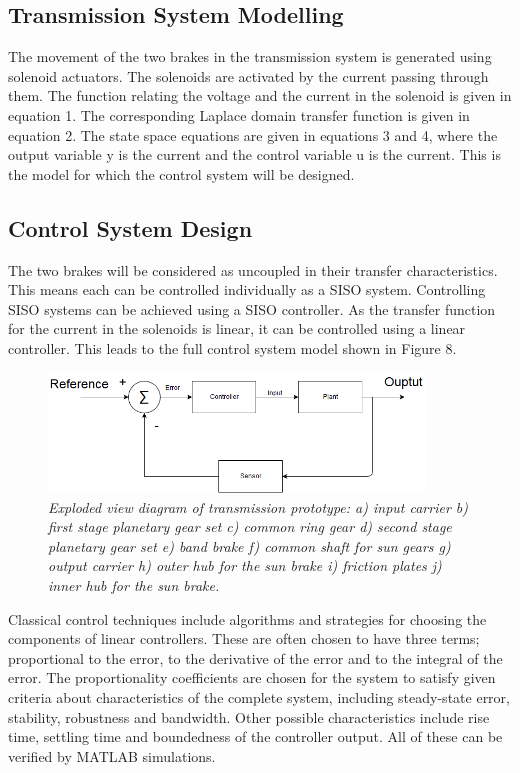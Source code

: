 \documentclass{article}
\begin{document}
\subsection{Transmission System Modelling }
\begin{flushleft}
The movement of the two brakes in the transmission system is generated using solenoid actuators. The solenoids are activated by the current passing through them. The function relating the voltage and the current in the solenoid is given in equation 1. The corresponding Laplace domain transfer function is given in equation 2. The state space equations are given in equations 3 and 4, where the output variable y is the current and the control variable u is the current. This is the model for which the control system will be designed. 
\end{flushleft}

\subsection{Control System Design}
\begin{flushleft}
The two brakes will be considered as uncoupled in their transfer characteristics. This means each can be controlled individually as a SISO system. Controlling SISO systems can be achieved using a SISO controller. As the transfer function for the current in the solenoids is linear, it can be controlled using a linear controller. This leads to the full control system model shown in Figure 8.\end{flushleft}

\begin{figure}[!ht]
\centering 
\includegraphics[width=10cm]{fig_7.png}
\caption{\small \sl Exploded view diagram of transmission prototype: a) input carrier b) first stage planetary gear set c) common ring gear d) second stage planetary gear set e) band brake f) common shaft for sun gears g) output carrier h) outer hub for the sun brake i) friction plates j) inner hub for the sun brake.}  
\end{figure}

\begin{flushleft}
Classical control techniques include algorithms and strategies for choosing the components of linear controllers. These are often chosen to have three terms; proportional to the error, to the derivative of the error and to the integral of the error. The proportionality coefficients are chosen for the system to satisfy given criteria about characteristics of the complete system, including steady-state error, stability, robustness and bandwidth. Other possible characteristics include rise time, settling time and boundedness of the controller output. All of these can be verified by MATLAB simulations.\end{flushleft}
\end{document}
